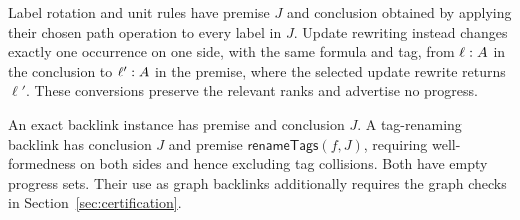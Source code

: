 Label rotation and unit rules have premise $J$ and conclusion obtained by
applying their chosen path operation to every label in $J$. Update rewriting
instead changes exactly one occurrence on one side, with the same formula
and tag, from $\ell:A$ in the conclusion to $\ell':A$ in the
premise, where the selected update rewrite returns $\ell'$. These conversions
preserve the relevant ranks and advertise no progress.

An exact backlink instance has premise and conclusion $J$. A tag-renaming
backlink has conclusion $J$ and premise $\mathsf{renameTags}(f,J)$, requiring
well-formedness on both sides and hence excluding tag collisions. Both have
empty progress sets. Their use as graph backlinks additionally requires
the graph checks in Section~\ref{sec:certification}.
